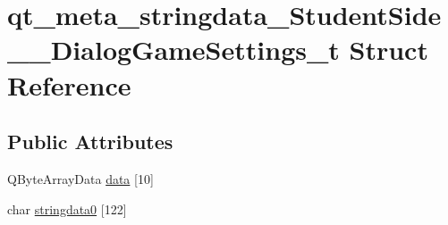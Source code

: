 \hypertarget{structqt__meta__stringdata___student_side_____dialog_game_settings__t}{\section{qt\-\_\-meta\-\_\-stringdata\-\_\-\-Student\-Side\-\_\-\-\_\-\-Dialog\-Game\-Settings\-\_\-t Struct Reference}
\label{structqt__meta__stringdata___student_side_____dialog_game_settings__t}
}
\subsection*{Public Attributes}
\begin{DoxyCompactItemize}
\item 
Q\-Byte\-Array\-Data \hyperlink{structqt__meta__stringdata___student_side_____dialog_game_settings__t_a7ff98fd212e598560d745b5514d4404a}{data} \mbox{[}10\mbox{]}
\item 
char \hyperlink{structqt__meta__stringdata___student_side_____dialog_game_settings__t_a003ddd07e53c401c4007209b65ea5da5}{stringdata0} \mbox{[}122\mbox{]}
\end{DoxyCompactItemize}


